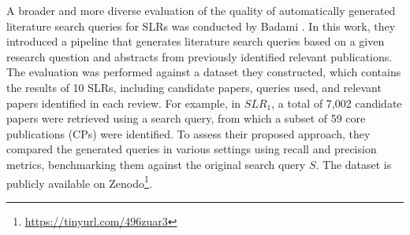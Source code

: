A broader and more diverse evaluation of the quality of automatically generated literature search queries for SLRs was conducted by Badami \autocite{badami2023adaptive}. In this work, they introduced a pipeline that generates literature search queries based on a given research question and abstracts from previously identified relevant publications. The evaluation was performed against a dataset they constructed, which contains the results of 10 SLRs, including candidate papers, queries used, and relevant papers identified in each review. For example, in $SLR_1$, a total of 7,002 candidate papers were retrieved using a search query, from which a subset of 59 core publications (CPs) were identified. To assess their proposed approach, they compared the generated queries in various settings using recall and precision metrics, benchmarking them against the original search query $S$. The dataset is publicly available on Zenodo\footnote{\url{https://tinyurl.com/496zuar3}}.
